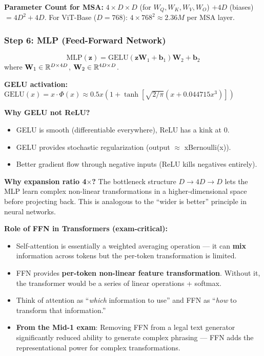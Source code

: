 \textbf{Parameter Count for MSA:}
$4 \times D \times D$ (for $W_Q, W_K, W_V, W_O$) $+ 4D$ (biases) $= 4D^2 + 4D$.
For ViT-Base ($D{=}768$): $4 \times 768^2 \approx 2.36M$ per MSA layer.

\subsubsection{Step 6: MLP (Feed-Forward Network)}
$$\text{MLP}(\mathbf{z}) = \text{GELU}(\mathbf{z}\mathbf{W}_1 + \mathbf{b}_1)\mathbf{W}_2 + \mathbf{b}_2$$
where $\mathbf{W}_1 \in \mathbb{R}^{D \times 4D}$, $\mathbf{W}_2 \in \mathbb{R}^{4D \times D}$.

\textbf{GELU activation:} $\text{GELU}(x) = x \cdot \Phi(x) \approx 0.5x(1 + \tanh[\sqrt{2/\pi}(x + 0.044715x^3)])$

\textbf{Why GELU not ReLU?}
\begin{itemize}
\item GELU is smooth (differentiable everywhere), ReLU has a kink at 0.
\item GELU provides stochastic regularization (output $\approx$ xBernoulli(x)).
\item Better gradient flow through negative inputs (ReLU kills negatives entirely).
\end{itemize}

\textbf{Why expansion ratio 4$\times$?}
The bottleneck structure $D \to 4D \to D$ lets the MLP learn complex non-linear transformations in a higher-dimensional space before projecting back. This is analogous to the ``wider is better'' principle in neural networks.

\textbf{Role of FFN in Transformers (exam-critical):}
\begin{itemize}
\item Self-attention is essentially a weighted averaging operation — it can \textbf{mix} information across tokens but the per-token transformation is limited.
\item FFN provides \textbf{per-token non-linear feature transformation}. Without it, the transformer would be a series of linear operations + softmax.
\item Think of attention as ``\textit{which} information to use'' and FFN as ``\textit{how} to transform that information.''
\item \textbf{From the Mid-1 exam}: Removing FFN from a legal text generator significantly reduced ability to generate complex phrasing — FFN adds the representational power for complex transformations.
\end{itemize}

